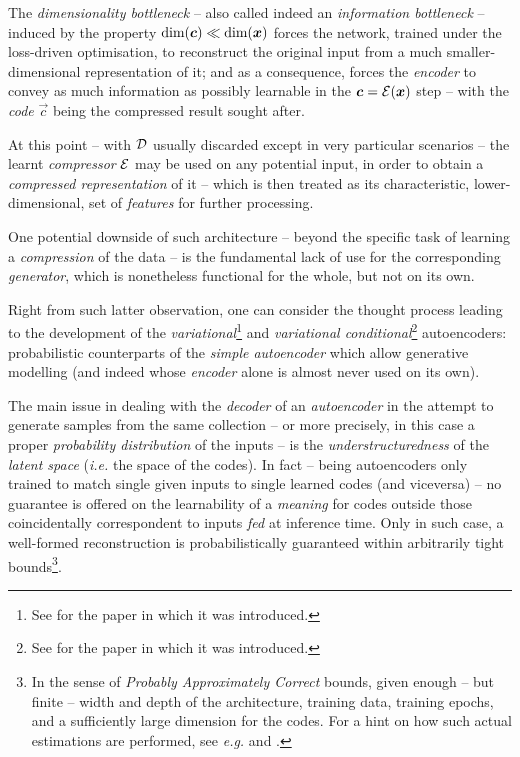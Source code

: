 The \textit{dimensionality bottleneck} -- also called indeed an \textit{information bottleneck} -- induced by the property $\text{dim}(\bm{c}) \ll \text{dim}(\bm{x})$ forces the network, trained under the loss-driven optimisation, to reconstruct the original input from a much smaller-dimensional representation of it; and as a consequence, forces the \textit{encoder} to convey as much information as possibly learnable in the $\bm{c} = \mathcal{E}(\bm{x})$ step -- with the \textit{code} $\vec{c}$ being the compressed result sought after.

At this point -- with $\mathcal{D}$ usually discarded except in very particular scenarios -- the learnt \textit{compressor} $\mathcal{E}$ may be used on any potential input, in order to obtain a \textit{compressed representation} of it -- which is then treated as its characteristic, lower-dimensional, set of \textit{features} for further processing.

One potential downside of such architecture -- beyond the specific task of learning a \textit{compression} of the data -- is the fundamental lack of use for the corresponding \textit{generator}, which is nonetheless functional for the whole, but not on its own.

Right from such latter observation, one can consider the thought process leading to the development of the \textit{variational}\footnote{See \cite{KingmaWelling2014AutoEncoding} for the paper in which it was introduced.} and \textit{variational conditional}\footnote{See \cite{SohnEtAl2015CVAE} for the paper in which it was introduced.} autoencoders: probabilistic counterparts of the \textit{simple autoencoder} which allow generative modelling (and indeed whose \textit{encoder} alone is almost never used on its own).

The main issue in dealing with the \textit{decoder} of an \textit{autoencoder} in the attempt to generate samples from the same collection -- or more precisely, in this case a proper \textit{probability distribution} of the inputs --  is the \textit{understructuredness} of the \textit{latent space} (\textit{i.e.} the space of the codes). In fact -- being autoencoders only trained to match single given inputs to single learned codes (and viceversa) -- no guarantee is offered on the learnability of a \textit{meaning} for codes outside those coincidentally correspondent to inputs \textit{fed} at inference time. Only in such case, a well-formed reconstruction is probabilistically guaranteed within arbitrarily tight bounds\footnote{In the sense of \textit{Probably Approximately Correct} bounds, given enough -- but finite -- width and depth of the architecture, training data, training epochs, and a sufficiently large dimension for the codes. For a hint on how such actual estimations are performed, see \textit{e.g.} \cite{EpsteinMeir2019AEPAC} and \cite{ZehaoEtAl2020AEPAC}.}.

